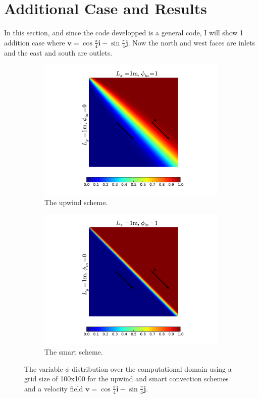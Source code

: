 \documentclass[a4paper, 11pt]{article}
\begin{document}
\section*{Additional Case and Results}
In this section, and since the code developped is a general code, I will show 1 addition case where $\textbf{v}=\cos\frac{\pi}{4}\textbf{i}-\sin\frac{\pi}{4}\textbf{j}$. Now the north and west faces are inlets and the east and south are outlets.
\makeatletter
\setlength{\@fptop}{0pt}
\makeatother
\begin{figure}[ht!]
\centering
\begin{subfigure}{0.5\textwidth}
  \centering
  \includegraphics[width=1\linewidth]{addUp.pdf}
  \caption{The upwind scheme.}
  \label{fig:sub31}
\end{subfigure}%
\begin{subfigure}{0.5\textwidth}
  \centering
  \includegraphics[width=1\linewidth]{addSmart.pdf}
  \caption{The smart scheme.}
  \label{fig:sub2}
\end{subfigure}
\caption{The variable $\phi$ distribution over the computational domain using a grid size of 100x100 for the upwind and smart convection schemes and a velocity field $\textbf{v}=\cos\frac{\pi}{4}\textbf{i}-\sin\frac{\pi}{4}\textbf{j}$.}
\label{fig:sub32}
\end{figure}
\end{document}
